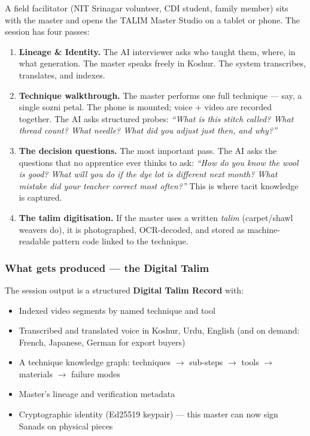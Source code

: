 \documentclass[11pt, a4paper]{article}
\begin{document}
A field facilitator (NIT Srinagar volunteer, CDI student, family member) sits with the master and opens the TALIM Master Studio on a tablet or phone. The session has four passes:

\begin{enumerate}[label=\textbf{Pass \arabic*.}]
  \item \textbf{Lineage \& Identity.} The AI interviewer asks who taught them, where, in what generation. The master speaks freely in Koshur. The system transcribes, translates, and indexes.
  \item \textbf{Technique walkthrough.} The master performs one full technique — say, a single sozni petal. The phone is mounted; voice + video are recorded together. The AI asks structured probes: \textit{``What is this stitch called? What thread count? What needle? What did you adjust just then, and why?''}
  \item \textbf{The decision questions.} The most important pass. The AI asks the questions that no apprentice ever thinks to ask: \textit{``How do you know the wool is good? What will you do if the dye lot is different next month? What mistake did your teacher correct most often?''} This is where tacit knowledge is captured.
  \item \textbf{The talim digitisation.} If the master uses a written {\itshape talim} (carpet/shawl weavers do), it is photographed, OCR-decoded, and stored as machine-readable pattern code linked to the technique.
\end{enumerate}

\subsubsection{What gets produced — the Digital Talim}

The session output is a structured \textbf{Digital Talim Record} with:

\begin{itemize}
  \item Indexed video segments by named technique and tool
  \item Transcribed and translated voice in Koshur, Urdu, English (and on demand: French, Japanese, German for export buyers)
  \item A technique knowledge graph: techniques $\to$ sub-steps $\to$ tools $\to$ materials $\to$ failure modes
  \item Master's lineage and verification metadata
  \item Cryptographic identity (Ed25519 keypair) — this master can now sign Sanads on physical pieces
\end{itemize}
\end{document}
